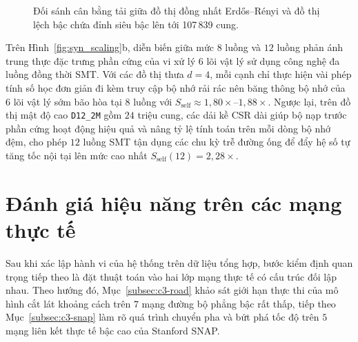\begin{figure}[!htb]
{%
}
\caption{Đối sánh cân bằng tải giữa đồ thị đồng nhất Erd\H{o}s--R\'{e}nyi và đồ thị lệch bậc chứa đỉnh siêu bậc lên tới 107\,839 cung.}
\label{fig:tikz_hub_balance}
\end{figure}

Trên Hình~\ref{fig:syn_scaling}b, diễn biến giữa mức $8$ luồng và $12$ luồng phản ánh trung thực đặc trưng phần cứng của vi xử lý $6$ lõi vật lý sử dụng công nghệ đa luồng đồng thời SMT. Với các đồ thị thưa $d = 4$, mỗi cạnh chỉ thực hiện vài phép tính số học đơn giản đi kèm truy cập bộ nhớ rải rác nên băng thông bộ nhớ của $6$ lõi vật lý sớm bão hòa tại $8$ luồng với $S_{\mathrm{self}} \approx 1{,}80\times$--$1{,}88\times$. Ngược lại, trên đồ thị mật độ cao \texttt{D12\_2M} gồm $24$ triệu cung, các dải kề CSR dài giúp bộ nạp trước phần cứng hoạt động hiệu quả và nâng tỷ lệ tính toán trên mỗi dòng bộ nhớ đệm, cho phép $12$ luồng SMT tận dụng các chu kỳ trễ đường ống để đẩy hệ số tự tăng tốc nội tại lên mức cao nhất $S_{\mathrm{self}}(12) = 2{,}28\times$.

\section{Đánh giá hiệu năng trên các mạng thực tế}\label{sec:c3-realworld}

Sau khi xác lập hành vi của hệ thống trên dữ liệu tổng hợp, bước kiểm định quan trọng tiếp theo là đặt thuật toán vào hai lớp mạng thực tế có cấu trúc đối lập nhau. Theo hướng đó, Mục~\ref{subsec:c3-road} khảo sát giới hạn thực thi của mô hình cắt lát khoảng cách trên $7$ mạng đường bộ phẳng bậc rất thấp, tiếp theo Mục~\ref{subsec:c3-snap} làm rõ quá trình chuyển pha và bứt phá tốc độ trên $5$ mạng liên kết thực tế bậc cao của Stanford SNAP.

